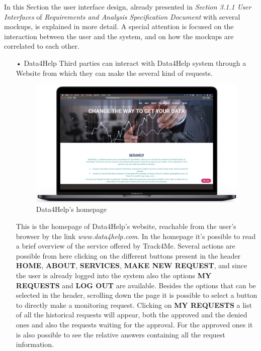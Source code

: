 \noindent
In this Section the user interface design, already presented in  \textit{Section 3.1.1 User Interfaces} of \textit{Requirements and Analysis Specification Document} with several mockups, is explained in more detail. A special attention is focused on the interaction between the user and the system, and on how the mockups are correlated to each other.
\bigbreak
\noindent
\begin{enumerate}
\item[•]{\Large Data4Help}
\bigbreak
\noindent
Third parties can interact with Data4Help system through a Website from which they can make the several kind of requests.
\begin{figure}[H]
        \centering
          \includegraphics[scale = 0.33]{Images/Mockups/Homepage.jpg}
          	\caption{Data4Help's homepage}
\end{figure}
This is the homepage of Data4Help's website, reachable from the user's browser by the link \textit{www.data4help.com}. In the homepage it's possible to read a brief overview of the service offered by Track4Me. Several actions are possible from here clicking on the different buttons present in the header \textbf{HOME}, \textbf{ABOUT}, \textbf{SERVICES}, \textbf{MAKE NEW REQUEST}, and since the user is already logged into the system also the options \textbf{MY REQUESTS} and \textbf{LOG OUT} are available. Besides the options that can be selected in the header, scrolling down the page it is possible to select a button to directly make a monitoring request. 
\bigbreak
\noindent
Clicking on \textbf{MY REQUESTS} a list of all the historical requests will appear, both the approved and the denied ones and also the requests waiting for the approval. For the approved ones it is also possible to see the relative answers containing all the request information.
\clearpage


\end{enumerate}
